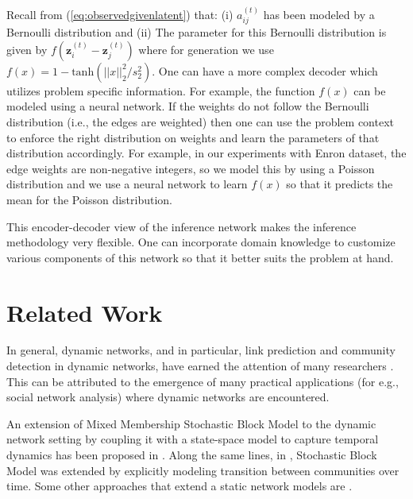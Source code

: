 \documentclass[letterpaper]{article}
\begin{document}
Recall from (\ref{eq:observedgivenlatent}) that: (i) ${a_{ij}^{(t)}}$ has been modeled by a Bernoulli distribution and (ii) The parameter for this Bernoulli distribution is given by $f(\mathbf{z}_i^{(t)} - \mathbf{z}_j^{(t)})$ where for generation we use $f(x) = 1 - \mathrm{tanh}(||x||_2^2/{s_2^2})$. One can have a more complex decoder which utilizes problem specific information. For example, the function $f(x)$ can be modeled using a neural network. If the weights do not follow the Bernoulli distribution (i.e., the edges are weighted) then one can use the problem context to enforce the right distribution on weights and learn the parameters of that distribution accordingly. For example, in our experiments with Enron dataset, the edge weights are non-negative integers, so we model this by using a Poisson distribution and we use a neural network to learn $f(x)$ so that it predicts the mean for the Poisson distribution.

This encoder-decoder view of the inference network makes the inference methodology very flexible. One can incorporate domain knowledge to customize various components of this network so that it better suits the problem at hand.


\section{Related Work}
\label{section:relatedwork}
In general, dynamic networks, and in particular, link prediction and community detection in dynamic networks, have earned the attention of many researchers \cite{GolderbergEtAl:2010:ASurveyOfStatisticalNetworkModels,KimEtAl:2017:AReviewOfDynamicNetworkModelsWithLatentVariables}. This can be attributed to the emergence of many practical applications (for e.g., social network analysis) where dynamic networks are encountered.

An extension of Mixed Membership Stochastic Block Model \cite{Airoldi:2008:MixedMembershipStochasticBlockmodels} to the dynamic network setting by coupling it with a state-space model to capture temporal dynamics has been proposed in \cite{XingEtAl:2010:AStateSpaceMixedMembershipBlockmodelForDynamicNetworkTomography,HoEtAl:2011:EvolvingClusterMixedMembershipBlockmodelforTimeVaryingNetworks}. Along the same lines, in \cite{YangEtAl:2011:DetectingCommunitiesAndTheirEvolutionsInDynamicSocialNetworksABayesianapproach}, Stochastic Block Model \cite{HollandEtAl:1983:StochasticBlockmodelsFirstSteps} was extended by explicitly modeling transition between communities over time. Some other approaches that extend a static network models are \cite{XuHero:2014:DynamicStochasticBlockmodelsForTimeEvolvingSocialNetworks,Xu:2015:StochasticBlockTransitionModelsForDynamicNetworks,PapadopoulosEtAl:2012:PopularityVsSimilarityInGrowingNetworks}.
\end{document}
